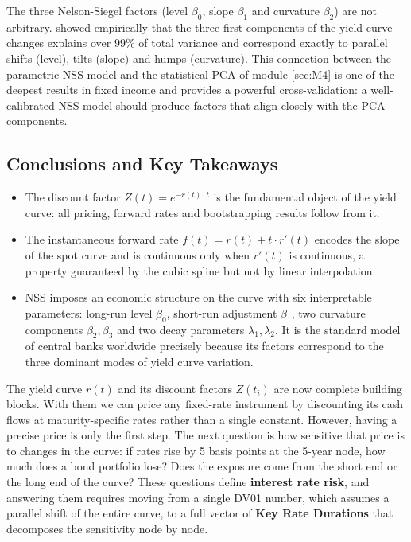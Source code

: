 \documentclass{article}
\theoremstyle{definition}  %
\theoremstyle{plain}  %
\numberwithin{definition}{section}
\numberwithin{proposition}{section}
\numberwithin{theorem}{section}
\numberwithin{equation}{section}
\begin{document}
The three Nelson-Siegel factors (level $\beta_{0}$, slope $\beta_{1}$ and curvature $\beta_{2}$) are not arbitrary. \cite{litterman1991volatility} showed empirically that the three first components of the yield curve changes explains over $99\%$ of total variance and correspond exactly to parallel shifts (level), tilts (slope) and humps (curvature). This connection between the parametric NSS model and the statistical PCA of module \ref{sec:M4} is one of the deepest results in fixed income and provides a powerful cross-validation: a well-calibrated NSS model should produce factors that align closely with the PCA components.


\subsection{Conclusions and Key Takeaways}

\begin{itemize}
    \item The discount factor $Z(t) = e^{-r(t) \cdot t}$ 
    is the fundamental object of the yield curve: 
    all pricing, forward rates and bootstrapping 
    results follow from it.
    
    \item The instantaneous forward rate $f(t) = 
    r(t) + t \cdot r'(t)$ encodes the slope of the 
    spot curve and is continuous only when $r'(t)$ 
    is continuous, a property guaranteed by the 
    cubic spline but not by linear interpolation.
    
    \item NSS imposes an economic structure on the 
    curve with six interpretable parameters: 
    long-run level $\beta_0$, short-run adjustment 
    $\beta_1$, two curvature components $\beta_2, 
    \beta_3$ and two decay parameters $\lambda_1, 
    \lambda_2$. It is the standard model of central 
    banks worldwide precisely because its factors 
    correspond to the three dominant modes of 
    yield curve variation.
\end{itemize}

The yield curve $r(t)$ and its discount factors $Z(t_i)$ are now complete building blocks. With them we can price any fixed-rate instrument by discounting its cash flows at maturity-specific rates rather than a single constant. However, having a precise price is only the first step. The next question is how sensitive that price is to changes in the curve: if rates rise by 5 basis points at the 5-year node, how much does a bond portfolio lose? Does the exposure come from the short end or the long end of the curve? These questions define \textbf{interest rate risk}, and answering them requires moving from a single DV01 number, which assumes a parallel shift of the entire curve, to a full vector of \textbf{Key Rate Durations} that decomposes the sensitivity node by node.
\end{document}
